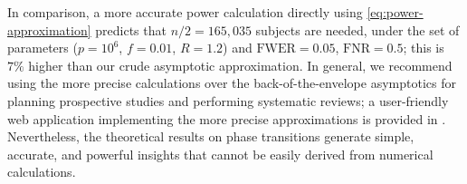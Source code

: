 In comparison, a more accurate power calculation directly using \eqref{eq:power-approximation} predicts that $n / 2 = 165,035$ subjects are needed, under the set of parameters ($p=10^6$, $f=0.01$, $R=1.2$) and $\mathrm{FWER}=0.05$, $\mathrm{FNR}=0.5$; this is $7\%$ higher than our crude asymptotic approximation.
In general, we recommend using the more precise calculations over the back-of-the-envelope asymptotics for planning prospective studies and performing systematic reviews;
a user-friendly web application implementing the more precise approximations is provided in \cite{gao2019upass}.
Nevertheless, the theoretical results on phase transitions generate simple, accurate, and powerful insights that cannot be easily derived from numerical calculations.

